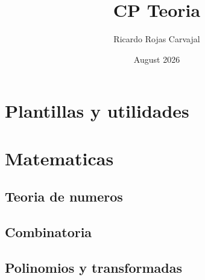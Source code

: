 \documentclass{article}
\title{CP Teoria}
\author{Ricardo Rojas Carvajal}
\date{August 2026}
\begin{document}
	\maketitle

	\tableofcontents

	\section{Plantillas y utilidades}
%	
%	
%	
%	
%	

	\section{Matematicas}
	\subsection{Teoria de numeros}
	
	
	
	
	
	
	
	
	
	
	
	

	\subsection{Combinatoria}
	
	
	
	
	

	\subsection{Polinomios y transformadas}
	
	
	
\end{document}
